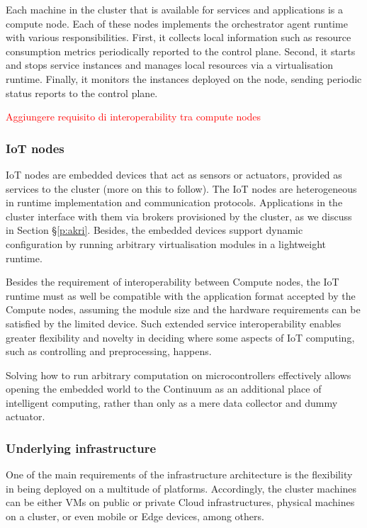 Each machine in the cluster that is available for services and applications is a compute node. Each of these nodes implements the orchestrator agent runtime with various responsibilities. First, it collects local information such as resource consumption metrics periodically reported to the control plane. Second, it starts and stops service instances and manages local resources via a virtualisation runtime. Finally, it monitors the instances deployed on the node, sending periodic status reports to the control plane.

\textcolor{red}{Aggiungere requisito di interoperability tra compute nodes}

\subsubsection{IoT nodes}

IoT nodes are embedded devices that act as sensors or actuators, provided as services to the cluster (more on this to follow). The IoT nodes are heterogeneous in runtime implementation and communication protocols. Applications in the cluster interface with them via brokers provisioned by the cluster, as we discuss in Section §\ref{p:akri}. Besides, the embedded devices support dynamic configuration by running arbitrary virtualisation modules in a lightweight runtime.

Besides the requirement of interoperability between Compute nodes, the IoT runtime must as well be compatible with the application format accepted by the Compute nodes, assuming the module size and the hardware requirements can be satisfied by the limited device. Such extended service interoperability enables greater flexibility and novelty in deciding where some aspects of IoT computing, such as controlling and preprocessing, happens. 

Solving how to run arbitrary computation on microcontrollers effectively allows opening the embedded world to the Continuum as an additional place of intelligent computing, rather than only as a mere data collector and dummy actuator.

\subsubsection{Underlying infrastructure}

One of the main requirements of the infrastructure architecture is the flexibility in being deployed on a multitude of platforms. Accordingly, the cluster machines can be either VMs on public or private Cloud infrastructures, physical machines on a cluster, or even mobile or Edge devices, among others.

